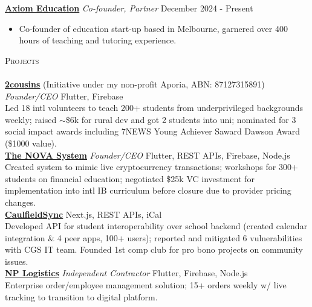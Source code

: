 \documentclass[a4paper]{article}
\newcommand{\lineunder} {
    \vspace*{-8pt} \\
    \hspace*{-10pt} \hrulefill \\
}
\newcommand{\header} [1] {
    {\hspace*{-10pt}\vspace*{6pt} \large\textsc{#1}}
    \vspace*{-6pt} \lineunder
}
\begin{document}
\textbf{\href{https://axiomeducation.org/}{\ul{Axiom Education}}} \textit{Co-founder, Partner} \hfill December 2024 - Present\\
\vspace{-3.5mm}
\begin{itemize} \itemsep 0.5pt
\item Co-founder of education start-up based in Melbourne, garnered over 400 hours of teaching and tutoring experience.
\end{itemize}
\vspace{-2.5mm}

\vspace*{1mm}
\header{Projects}
\href{https://2cousins.org/}{\textbf{\ul{2cousins}}} (Initiative under my non-profit Aporia, ABN: 87127315891) \textit{Founder/CEO} {\textsl{\hfill} Flutter, Firebase}\\
Led 18 intl volunteers to teach 200+ students from underprivileged backgrounds weekly; raised $\sim$\$6k for rural dev and got 2 students into uni; nominated for 3 social impact awards including 7NEWS Young Achiever Saward Dawson Award (\$1000 value).\\
\vspace*{1.5mm}
\href{https://the-nova-system.github.io/}{\textbf{\ul{The NOVA System}}} \textit{Founder/CEO} {\textsl{\hfill} Flutter, REST APIs, Firebase, Node.js}\\
Created system to mimic live cryptocurrency transactions; workshops for 300+ students on financial education; negotiated \$25k VC investment for implementation into intl IB curriculum before closure due to provider pricing changes.\\
\vspace*{1.5mm}
\href{https://caulfieldsync.vercel.app/}{\textbf{\ul{CaulfieldSync}}} {\textsl{\hfill} Next.js, REST APIs, iCal}\\
Developed API for student interoperability over school backend (created calendar integration \& 4 peer apps, 100+ users); reported and mitigated 6 vulnerabilities with CGS IT team.
Founded 1st comp club for pro bono projects on community issues.\\
\vspace*{1.5mm}
\href{https://nplogistics.com.au}{\textbf{\ul{NP Logistics}}} \textit{Independent Contractor} {\textsl{\hfill} Flutter, Firebase, Node.js}\\
Enterprise order/employee management solution; 15+ orders weekly w/ live tracking to transition to digital platform.\\
\vspace*{1.5mm}
\end{document}

